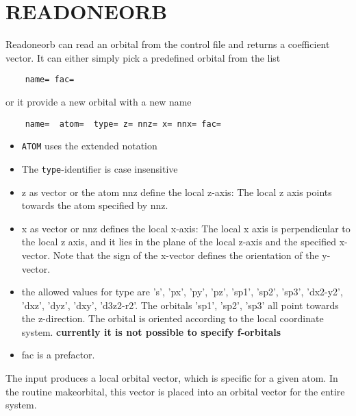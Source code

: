 \documentclass[11pt,a4paper]{report}
\begin{document}
\section{READONEORB}
Readoneorb can read an orbital from the control file and returns a
coefficient vector. It can either simply pick a predefined orbital
from the list
\begin{verbatim}
    name= fac= 
\end{verbatim}
or it provide a new orbital with a new name
\begin{verbatim}
    name=  atom=  type= z= nnz= x= nnx= fac=
\end{verbatim}
\begin{itemize}
\item \verb|ATOM| uses the extended notation
\item The \verb|type|-identifier is case insensitive
\item z as vector or the atom nnz define the local z-axis: The
  local z axis points towards the atom specified by nnz.
\item x as vector or nnz defines the local x-axis: The local x axis is
  perpendicular to the local z axis, and it lies in the plane of the
  local z-axis and the specified x-vector. Note that the sign of the
  x-vector defines the orientation of the y-vector.
\item the allowed values for type are 's', 'px', 'py', 'pz', 'sp1',
  'sp2', 'sp3', 'dx2-y2', 'dxz', 'dyz', 'dxy', 'd3z2-r2'. The orbitals
  'sp1', 'sp2', 'sp3' all point towards the z-direction. The orbital
  is oriented according to the local coordinate
  system. \textbf{currently it is not possible to specify f-orbitals}
\item fac is a prefactor.
\end{itemize}

The input produces a local orbital vector, which is specific for a
given atom. In the routine makeorbital, this vector is placed into an
orbital vector for the entire system.



\appendix
\section{}



\end{document}
